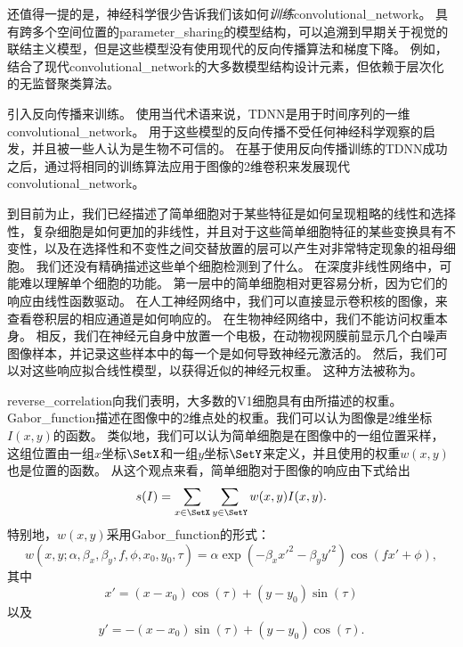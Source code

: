  
还值得一提的是，神经科学很少告诉我们该如何\emph{训练}\gls{convolutional_network}。
具有跨多个空间位置的\gls{parameter_sharing}的模型结构，可以追溯到早期关于视觉的联结主义模型\citep{Marr76}，但是这些模型没有使用现代的反向传播算法和梯度下降。
例如，\citep{Fukushima80}结合了现代\gls{convolutional_network}的大多数模型结构设计元素，但依赖于层次化的无监督聚类算法。

\cite{Lang+Hinton88}引入反向传播来训练。
使用当代术语来说，TDNN是用于时间序列的一维\gls{convolutional_network}。
用于这些模型的反向传播不受任何神经科学观察的启发，并且被一些人认为是生物不可信的。
在基于使用反向传播训练的TDNN成功之后，\cite{LeCun89d}通过将相同的训练算法应用于图像的2维卷积来发展现代\gls{convolutional_network}。

到目前为止，我们已经描述了简单细胞对于某些特征是如何呈现粗略的线性和选择性，复杂细胞是如何更加的非线性，并且对于这些简单细胞特征的某些变换具有不变性，以及在选择性和不变性之间交替放置的层可以产生对非常特定现象的祖母细胞。
我们还没有精确描述这些单个细胞检测到了什么。
在深度非线性网络中，可能难以理解单个细胞的功能。
第一层中的简单细胞相对更容易分析，因为它们的响应由线性函数驱动。
在人工神经网络中，我们可以直接显示卷积核的图像，来查看卷积层的相应通道是如何响应的。
在生物神经网络中，我们不能访问权重本身。
相反，我们在神经元自身中放置一个电极，在动物视网膜前显示几个白噪声图像样本，并记录这些样本中的每一个是如何导致神经元激活的。
然后，我们可以对这些响应拟合线性模型，以获得近似的神经元权重。
这种方法被称为\citep{ringach2004reverse}。
 
 
\gls{reverse_correlation}向我们表明，大多数的V1细胞具有由所描述的权重。
\gls{Gabor_function}描述在图像中的2维点处的权重。我们可以认为图像是2维坐标$I(x,y)$的函数。
类似地，我们可以认为简单细胞是在图像中的一组位置采样，这组位置由一组$x$坐标$\SetX$和一组$y$坐标$\SetY$来定义，并且使用的权重$w(x,y)$也是位置的函数。
从这个观点来看，简单细胞对于图像的响应由下式给出
\begin{equation}
  s(I)=\sum_{x\in \SetX} \sum_{y\in \SetY} w(x, y)I(x,y).
\end{equation}
特别地，$w(x,y)$采用\gls{Gabor_function}的形式：
\begin{equation}
  w(x, y; \alpha, \beta_x, \beta_y, f, \phi, x_0, y_0, \tau) = \alpha \exp(-\beta_x x'^2 - \beta_y y'^2) \cos (fx' + \phi),
\end{equation}
其中
\begin{equation}
  x' = (x-x_0)\cos(\tau) + (y-y_0)\sin(\tau)
\end{equation}
以及
\begin{equation}
  y' = -(x-x_0) \sin(\tau) + (y-y_0)\cos(\tau).
\end{equation}

